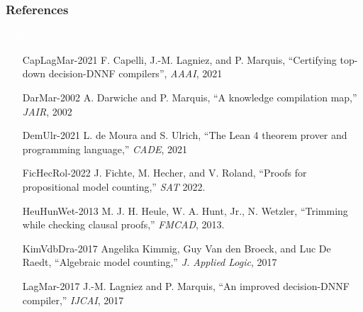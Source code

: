 \documentclass[t,pdf]{beamer}
\begin{document}
\begin{frame}

  \frametitle{References}

\medskip

\begin{minipage}{0.1\textwidth}
    \textcolor{white}{Filler}
\end{minipage}
\begin{minipage}{0.88\textwidth}
\footnotesize
\begin{itemize}

\item[CapLagMar-2021]
  F. Capelli, J.-M. Lagniez, and P. Marquis,
  ``Certifying top-down decision-{DNNF} compilers'',
  {\em AAAI}, 2021

\item[DarMar-2002]
  A. Darwiche and P. Marquis,
  ``A knowledge compilation map,''
  {\em JAIR}, 2002
  
\item[DemUlr-2021]
  L. de Moura and S. Ulrich,
  ``The Lean 4 theorem prover and programming language,''
{\em CADE},  2021

\item[FicHecRol-2022]
  J. Fichte, M. Hecher, and V. Roland,
  ``Proofs for propositional model counting,''
  {\em SAT} 2022.

\item[HeuHunWet-2013] M. J. H. Heule, W. A. Hunt, Jr., N. Wetzler,
  ``Trimming while checking clausal proofs,''
  {\em FMCAD}, 2013.


\item[KimVdbDra-2017] Angelika Kimmig, Guy Van den Broeck, and Luc De Raedt,
  ``Algebraic model counting,''
  {\em J. Applied Logic}, 2017

\item[LagMar-2017] J.-M. Lagniez and  P. Marquis,
  ``An improved decision-DNNF compiler,''
  {\em IJCAI}, 2017
\end{itemize}
\end{minipage}
\end{frame}
\end{document}
